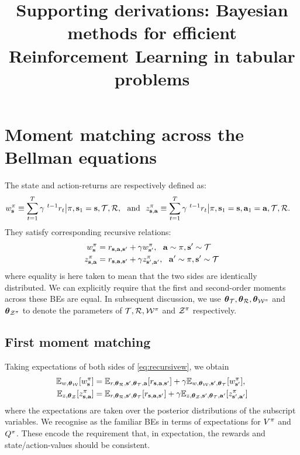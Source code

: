 \documentclass{article}
\title{Supporting derivations: Bayesian methods for efficient Reinforcement Learning in tabular problems}
\author{}
\begin{document}
\maketitle



\section*{Moment matching across the Bellman equations}

The state and action-returns are respectively defined as:
\begin{align*}
w^\pi_{\mathbf{s}} &\equiv \sum_{t = 1}^T \gamma^{~t - 1} r_t \big| \pi, \mathbf{s}_1 = \mathbf{s}, \mathcal{T}, \mathcal{R}, ~ \text{ and } ~ z^\pi_{\mathbf{s}, \mathbf{a}} \equiv \sum_{t = 1}^T \gamma^{~t - 1} r_t \big| \pi, \mathbf{s}_1 = \mathbf{s}, \mathbf{a}_1 = \mathbf{a}, \mathcal{T}, \mathcal{R}.
\end{align*}
They satisfy corresponding recursive relations:
\begin{align} \label{eq:recursivew}
w^\pi_{\mathbf{s}} &=  r_{\mathbf{s}, \mathbf{a}, \mathbf{s}'} + \gamma w^\pi_{\mathbf{s}'}, ~~ \mathbf{a} \sim \pi, \mathbf{s}' \sim \mathcal{T}\\
z^\pi_{\mathbf{s}, \mathbf{a}} &=  r_{\mathbf{s}, \mathbf{a}, \mathbf{s}'} + \gamma z^\pi_{\mathbf{s}', \mathbf{a}'}, ~~ \mathbf{a}' \sim \pi, \mathbf{s}' \sim \mathcal{T} \label{eq:recursivez}
\end{align}
where equality is here taken to mean that the two sides are identically distributed. We can explicitly require that the first and second-order moments across these BEs are equal. In subsequent discussion, we use $\boldsymbol{\theta}_{\mathcal{T}}, \boldsymbol{\theta}_{\mathcal{R}}, \boldsymbol{\theta}_{\mathcal{W}^\pi}$ and $\boldsymbol{\theta}_{\mathcal{Z}^\pi}$ to denote the parameters of $\mathcal{T}, \mathcal{R}, \mathcal{W}^\pi$ and $\mathcal{Z}^\pi$ respectively.

\subsection*{First moment matching}

Taking expectations of both sides of \cref{eq:recursivew}, we obtain
\begin{equation}\label{muconsist}
\begin{aligned} 
\mathbb{E}_{w, \boldsymbol{\theta}_{\mathcal{W}}}[w^\pi_{\mathbf{s}}] &=  \mathbb{E}_{r, \boldsymbol{\theta}_{\mathcal{R}}, \mathbf{s}', \boldsymbol{\theta}_{\mathcal{T}}, \mathbf{a}}[r_{\mathbf{s}, \mathbf{a}, \mathbf{s}'}] + \gamma  \mathbb{E}_{w, \boldsymbol{\theta}_{\mathcal{W}}, \mathbf{s}', \boldsymbol{\theta}_{\mathcal{T}}}[w^\pi_{\mathbf{s}'}], \\
\mathbb{E}_{z, \boldsymbol{\theta}_{\mathcal{Z}}}[z^\pi_{\mathbf{s}, \mathbf{a}}] &=  \mathbb{E}_{r, \boldsymbol{\theta}_{\mathcal{R}}, \mathbf{s}', \boldsymbol{\theta}_{\mathcal{T}}}[r_{\mathbf{s}, \mathbf{a}, \mathbf{s}'}] + \gamma \mathbb{E}_{z, \boldsymbol{\theta}_{\mathcal{Z}}, \mathbf{s}', \boldsymbol{\theta}_{\mathcal{T}}, \mathbf{a}'}[z^\pi_{\mathbf{s}', \mathbf{a}'}]
\end{aligned}
\end{equation}
where the expectations are taken over the posterior distributions of the subscript variables. We recognise as the familiar BEs in terms of expectations for $V^{\pi}$ and $Q^{\pi}$. These encode the requirement that, in expectation, the rewards and state/action-values should be consistent.
\end{document}
